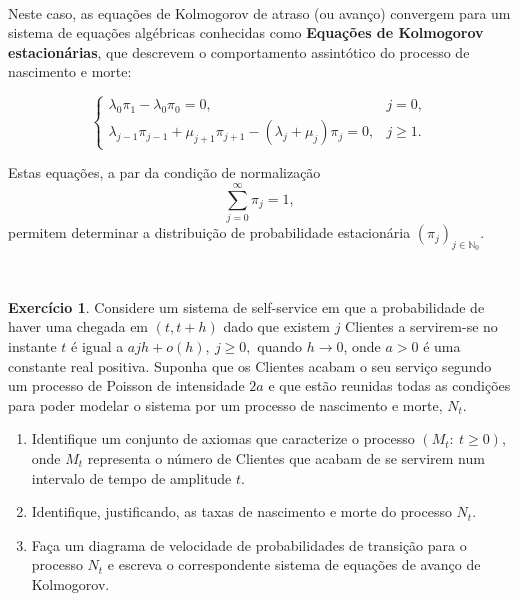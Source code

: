 \documentclass[
  11pt,
  a4paper,
]{book}
\theoremstyle{definition}
\theoremstyle{definition}
\theoremstyle{definition}
\newtheorem{exercise}{Exercício}[chapter]
\theoremstyle{definition}
\theoremstyle{remark}
\begin{document}
\(\,\)

Neste caso, as equações de Kolmogorov de atraso (ou avanço) convergem para um sistema de equações algébricas conhecidas como \textbf{Equações de Kolmogorov estacionárias}, que descrevem o comportamento assintótico do processo de nascimento e morte:

\[
\boxed{
\begin{cases}
\lambda_0 \pi_1 - \lambda_0 \pi_0 = 0, & j = 0, \\
\lambda_{j-1} \pi_{j-1} + \mu_{j+1} \pi_{j+1} - (\lambda_j + \mu_j) \pi_j = 0, & j \geq 1.
\end{cases}}
\]

Estas equações, a par da condição de normalização
\[
\sum_{j=0}^{\infty} \pi_j = 1,
\]
permitem determinar a distribuição de probabilidade estacionária \((\pi_j)_{j \in \mathbb{N}_0}\).

\(\,\)

\begin{exercise}
\leavevmode

Considere um sistema de self-service em que a probabilidade de haver uma chegada em \((t,t+h)\) dado que existem \(j\) Clientes a servirem-se no instante \(t\) é igual a \(ajh+o(h), ~j \geq 0,\) quando \(h \to 0\), onde \(a>0\) é uma constante real positiva. Suponha que os Clientes acabam o seu serviço segundo um processo de Poisson de intensidade \(2a\) e que estão reunidas todas as condições para poder modelar o sistema por um processo de nascimento e morte, \(N_t\).

\begin{enumerate}
\def\labelenumi{\alph{enumi})}
\item
  Identifique um conjunto de axiomas que caracterize o processo \((M_t: ~t \geq 0)\), onde \(M_t\) representa o número de Clientes que acabam de se servirem num intervalo de tempo de amplitude \(t\).
\item
  Identifique, justificando, as taxas de nascimento e morte do processo \(N_t\).
\item
  Faça um diagrama de velocidade de probabilidades de transição para o processo \(N_t\) e escreva o correspondente sistema de equações de avanço de Kolmogorov.
\end{enumerate}

\end{exercise}
\end{document}
